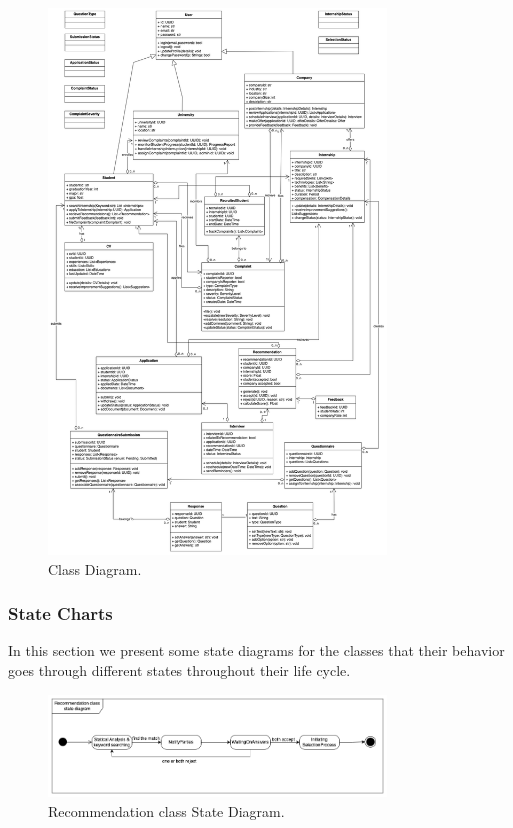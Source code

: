 \begin{figure}[H]
\centering
\includegraphics[width=0.8\textwidth]{Images/Class Diagram.drawio (4).png}
\caption{\label{fig:metamodel1}Class Diagram.}
\end{figure}

\subsubsection{State Charts}

In this section we present some state diagrams for the classes that their behavior goes through different states throughout their life cycle.

\begin{figure}[H]
\centering
\includegraphics[width=0.8\textwidth]{Images/Recommendation_State_Diagram.drawio.png}
\caption{\label{fig:metamodel1}Recommendation class State Diagram.}
\end{figure}

